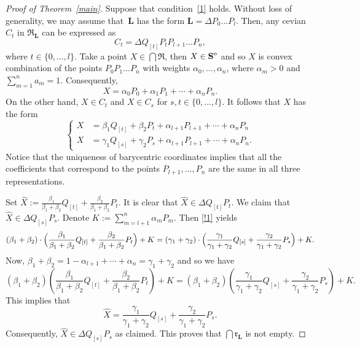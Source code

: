 \documentclass[12pt, reqno]{amsart}
\theoremstyle{definition}
\theoremstyle{remark}
\numberwithin{equation}{section}
\newcommand{\interior}[1]{%
  {\kern0pt#1}^{\mathrm{o}}%
}
\begin{document}
{\begin{proof}[Proof of Theorem~\ref{main}]
Suppose that condition~\eqref{1} holds. Without loss of generality, we may assume that~$\mathbf{L}$ has the form $\mathbf{L}=\Delta P_0...P_l$. Then, any cevian~$C_t$ in $\mathfrak{R}_\mathbf{L}$ can be expressed as 
\[
C_t=\Delta Q_{[t]}P_t P_{l+1}...P_{n},
\]
where $t\in \{0,...,l\}$. Take a point $X\in \bigcap\mathfrak{R}$, then $X\in \interior{\mathbf{S}}$ and so $X$ is convex combination of the points $P_0P_1...P_n$ with weights $\alpha_0,...,\alpha_n$, where $\alpha_m>0$ and $\sum_{m=1}^n a_m = 1$. Consequently, 
\[
X=\alpha_0 P_0+\alpha_1P_1+ \dotsb +\alpha_{n}P_n.
\]
On the other hand, $X\in C_t$ and $X\in C_s$ for $s,t\in\{0,...,l\}$. It follows that $X$ has the form
\begin{equation}\label{!1}
\begin{cases}
  X &= \beta_1Q_{[t]}+\beta_2P_t+\alpha_{l+1}P_{l+1}+ \dotsb +\alpha_{n}P_n\\
  X &= \gamma_1Q_{[s]}+\gamma_2P_s+\alpha_{l+1}P_{l+1}+ \dotsb +\alpha_{n}P_n.
\end{cases}
\end{equation}
Notice that the uniqueness of barycentric coordinates implies that all the coefficients that correspond to the points $P_{l+1}, \dotsc, P_{n}$ are the same in all three representations. 

Set $\hat X:=\frac{\beta_1}{\beta_1+\beta_2}Q_{[t]}+\frac{\beta_2}{\beta_1+\beta_2}P_t$. It is clear that $\hat X\in\Delta Q_{[t]}P_t$. We claim that $\hat X\in \Delta Q_{[s]}P_s$. %
Denote $K := \sum_{m=l+1}^n\alpha_mP_m$. Then \eqref{!1} yields
\[
  (\beta_1+\beta_2)\cdot\Bigl(\frac{\beta_1}{\beta_1+\beta_2}Q_{[t]}+\frac{\beta_2}{\beta_1+\beta_2}P_t\Bigr)+K
  =
  (\gamma_1+\gamma_2)\cdot \Bigl(\frac{\gamma_1}{\gamma_1+\gamma_2} Q_{[s]}+\frac{\gamma_2}{\gamma_1+\gamma_2}P_s\Bigr)+K.
\]
Now, $\beta_1+\beta_2=1-\alpha_{l+1}+ \dotsb +\alpha_{n}=\gamma_1+\gamma_2$ and so we have
\[
  (\beta_1+\beta_2)(\frac{\beta_1}{\beta_1+\beta_2}Q_{[t]}+\frac{\beta_2}{\beta_1+\beta_2}P_t)+K
  =({\beta_1+\beta_2})(\frac{\gamma_1}{\gamma_1+\gamma_2} Q_{[s]}+\frac{\gamma_2}{\gamma_1+\gamma_2}P_s)+K.
\]
This implies that
\[
  \hat X=\frac{\gamma_1}{\gamma_1+\gamma_2} Q_{[s]}+\frac{\gamma_2}{\gamma_1+\gamma_2}P_s.
\]
Consequently, $\hat{X}\in\Delta Q_{[s]}P_s$ as claimed. This proves that $\bigcap\mathfrak{r}_\mathbf{L}$ is not empty.


\end{proof}}
\end{document}
